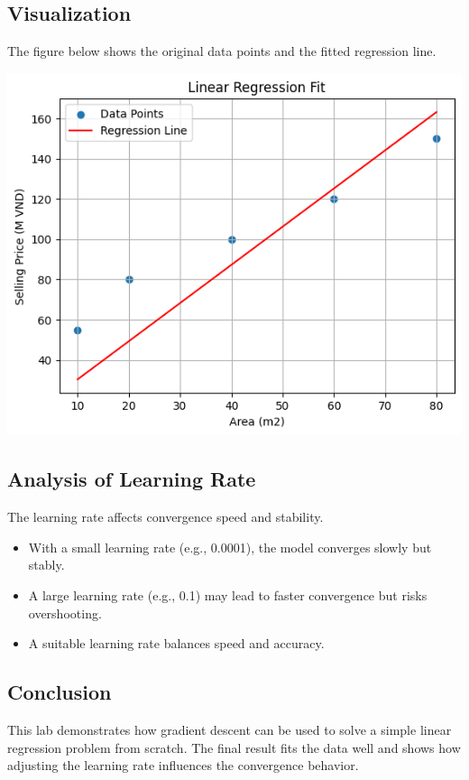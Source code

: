 \documentclass[12pt]{article}
\begin{document}
\subsection{Visualization}
The figure below shows the original data points and the fitted regression line.

\begin{center}
    \includegraphics[scale=0.7]{output.png}
\end{center}

\subsection{Analysis of Learning Rate}
The learning rate affects convergence speed and stability.

\begin{itemize}
    \item With a small learning rate (e.g., 0.0001), the model converges slowly but stably.
    \item A large learning rate (e.g., 0.1) may lead to faster convergence but risks overshooting.
    \item A suitable learning rate balances speed and accuracy.
\end{itemize}

\subsection{Conclusion}
This lab demonstrates how gradient descent can be used to solve a simple linear regression problem from scratch. The final result fits the data well and shows how adjusting the learning rate influences the convergence behavior.
\end{document}
